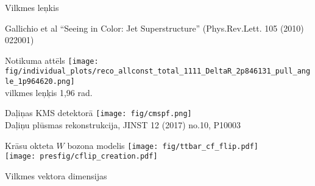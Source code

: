 \documentclass{beamer}
\begin{document}
\begin{frame}[fragile]{Vilkmes leņkis}
\begin{overlayarea}{\linewidth}{0.7\paperheight}
\begin{tikzpicture}
    \end{tikzpicture}
  \end{overlayarea}
  \centering
  \tiny Gallichio et al ``Seeing in Color: Jet Superstructure'' (Phys.Rev.Lett. 105 (2010) 022001)
\end{frame}

\begin{frame}{Notikuma attēls}\centering
  \texttt{[image: fig/individual\_plots/reco\_allconst\_total\_1111\_DeltaR\_2p846131\_pull\_angle\_1p964620.png]}
  \\vilkmes leņķis 1,96 rad.
\end{frame}

\begin{frame}{Daļiņas KMS detektorā}
  \centering
  \texttt{[image: fig/cmspf.png]}\\
  Daļiņu plūsmas rekonstrukcija, JINST 12 (2017) no.10, P10003
\end{frame}

\begin{frame}{Krāsu okteta $W$ bozona modelis}
  \centering
  \texttt{[image: fig/ttbar\_cf\_flip.pdf]}\\
  \vspace{0.5cm}
  \texttt{[image: presfig/cflip\_creation.pdf]}
\end{frame}

\begin{frame}{Vilkmes vektora dimensijas}
  \centering
  \def\twidth{0.33}
  \setcounter{subfigure}{0}
  \begin{figure}
  \end{figure}
\end{frame}
\end{document}
